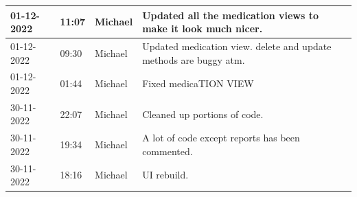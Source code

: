 \documentclass[11pt]{article}
\begin{document}
\begin{center}
\begin{longtable}{|p{2cm}|l|p{2cm}|p{10.5cm}|}
            01-12-2022                                 & 11:07                              & Michael                                 & Updated all the medication views to make it look much nicer.                                                                                                                                                                                                                                                 \\ \hline
            01-12-2022                                 & 09:30                              & Michael                                 & Updated medication view. delete and update methods are buggy atm.                                                                                                                                                                                                                                            \\ \hline
            01-12-2022                                 & 01:44                              & Michael                                 & Fixed medicaTION VIEW                                                                                                                                                                                                                                                                                        \\ \hline
            30-11-2022                                 & 22:07                              & Michael                                 & Cleaned up portions of code.                                                                                                                                                                                                                                                                                 \\ \hline
            30-11-2022                                 & 19:34                              & Michael                                 & A lot of code except reports has been commented.                                                                                                                                                                                                                                                             \\ \hline
            30-11-2022                                 & 18:16                              & Michael                                 & UI rebuild.                                                                                                                                                                                                                                                                                                  \\ \hline

\end{longtable}
\end{center}
\end{document}
